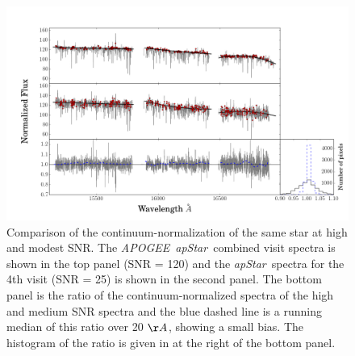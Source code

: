 \documentclass[12pt, preprint]{aastex}
\newcommand{\apogee}{\textsl{APOGEE}}
\newcommand{\apstar}{\textsl{apStar}}
\begin{document}
 \begin{figure}[!h]
  \includegraphics[width=\hsize]{./plots/SNR_continuum6.png}
  \caption{Comparison of the continuum-normalization of the same star at high and modest SNR. The \apogee\ \apstar\ combined visit spectra is shown in the top panel (SNR = 120) and the \apstar\ spectra for the 4th visit (SNR = 25) is shown in the second panel. The bottom panel is the ratio of the continuum-normalized spectra of the high and medium SNR spectra and the blue dashed line is a running median of this ratio over 20 $\AA$, showing a small bias. The histogram of the ratio is given in at the right of the bottom panel.}
\label{fig:lowsnr}
\end{figure}
\end{document}
